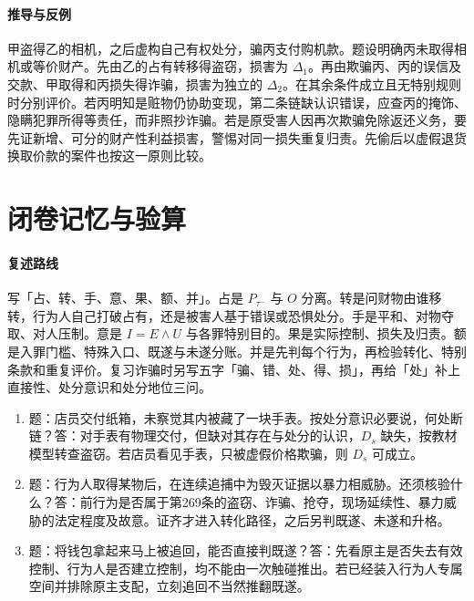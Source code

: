 \paragraph{推导与反例}
甲盗得乙的相机，之后虚构自己有权处分，骗丙支付购机款。题设明确丙未取得相机或等价财产。先由乙的占有转移得盗窃，损害为 $\Delta_1$。再由欺骗丙、丙的误信及交款、甲取得和丙损失得诈骗，损害为独立的 $\Delta_2$。在其余条件成立且无特别规则时分别评价。若丙明知是赃物仍协助变现，第二条链缺认识错误，应查丙的掩饰、隐瞒犯罪所得等责任，而非照抄诈骗。若是原受害人因再次欺骗免除返还义务，要先证新增、可分的财产性利益损害，警惕对同一损失重复归责。先偷后以虚假退货换取价款的案件也按这一原则比较。

\section*{闭卷记忆与验算}
\paragraph{复述路线}
写「占、转、手、意、果、额、并」。占是 $P_{\tau^-}$ 与 $O$ 分离。转是问财物由谁移转，行为人自己打破占有，还是被害人基于错误或恐惧处分。手是平和、对物夺取、对人压制。意是 $I=E\land U$ 与各罪特别目的。果是实际控制、损失及归责。额是入罪门槛、特殊入口、既遂与未遂分账。并是先判每个行为，再检验转化、特别条款和重复评价。复习诈骗时另写五字「骗、错、处、得、损」，再给「处」补上直接性、处分意识和处分地位三问。

\begin{enumerate}
\item 题：店员交付纸箱，未察觉其内被藏了一块手表。按处分意识必要说，何处断链？答：对手表有物理交付，但缺对其存在与处分的认识，$D_s$ 缺失，按教材模型转查盗窃。若店员看见手表，只被虚假价格欺骗，则 $D_s$ 可成立。
\item 题：行为人取得某物后，在连续追捕中为毁灭证据以暴力相威胁。还须核验什么？答：前行为是否属于第269条的盗窃、诈骗、抢夺，现场延续性、暴力威胁的法定程度及故意。证齐才进入转化路径，之后另判既遂、未遂和升格。
\item 题：将钱包拿起来马上被追回，能否直接判既遂？答：先看原主是否失去有效控制、行为人是否建立控制，均不能由一次触碰推出。若已经装入行为人专属空间并排除原主支配，立刻追回不当然推翻既遂。
\end{enumerate}
